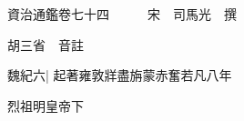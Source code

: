 






























































資治通鑑卷七十四　　　宋　司馬光　撰

胡三省　音註

魏紀六|{
	起著雍敦牂盡旃蒙赤奮若凡八年}


烈祖明皇帝下

